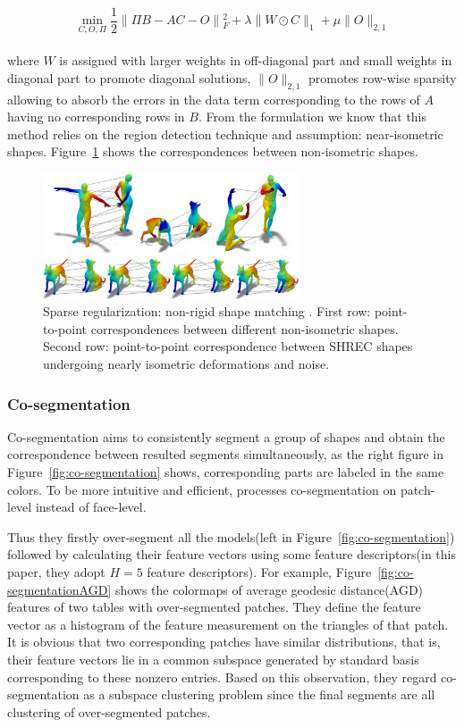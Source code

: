 \small{
\begin{equation}
 \label{eq:non-rigid shape matching}
 \min_{C,O,\Pi}\frac{1}{2} \|\Pi B - AC - O \|{_{F}^2} + \lambda\| W \odot C\|_1+\mu\|O\|_{2,1}
\end{equation}
}
\\
where $W$ is assigned with larger weights in off-diagonal part and small weights in diagonal part to promote diagonal solutions, $\|O\|_{2,1}$ promotes row-wise sparsity allowing to absorb the errors in the data term corresponding to the rows of $A$ having no corresponding rows in $B$.
From the formulation we know that this method relies on the region detection technique and assumption: near-isometric shapes.
Figure~\ref{fig:non-rigid matching} shows the correspondences between non-isometric shapes.

\begin{figure}[ht]
  \centering
  \includegraphics[width=3in]{images/matching_L1}
  \caption{Sparse regularization: non-rigid shape matching \cite{wang2014decoupling}. First row: point-to-point correspondences between different non-isometric shapes. Second row: point-to-point correspondence between SHREC shapes undergoing nearly isometric deformations and noise.}
  \label{fig:non-rigid matching}
\end{figure}


\subsubsection{Co-segmentation}
\label{subsubsec:co-segmentation}

Co-segmentation aims to consistently segment a group of shapes and obtain the correspondence between resulted segments simultaneously,
as the right figure in Figure~\ref{fig:co-segmentation} shows, corresponding parts are labeled in the same colors.
To be more intuitive and efficient, \cite{hu2012co} processes co-segmentation on patch-level instead of face-level.

Thus they firstly over-segment all the models(left in Figure~\ref{fig:co-segmentation}) followed by calculating their feature vectors using some feature descriptors(in this paper, they adopt $H=5$ feature descriptors).
For example, Figure~\ref{fig:co-segmentationAGD} shows the colormaps of average geodesic distance(AGD) features of two tables with over-segmented patches.
They define the feature vector as a histogram of the feature measurement on the triangles of that patch.
It is obvious that two corresponding patches have similar distributions, that is, their feature vectors lie in a common subspace generated by standard basis corresponding to these nonzero entries.
Based on this observation, they regard co-segmentation as a subspace clustering problem since the final segments are all clustering of over-segmented patches.

